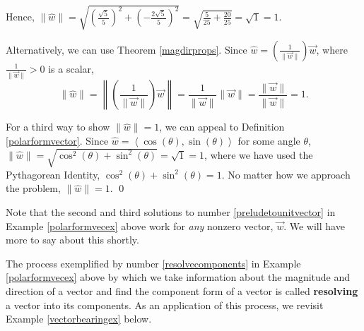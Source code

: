 \documentclass{ximera}
\begin{document}
\begin{example}
\begin{explanation}
\begin{enumerate}
\begin{enumerate}
 

Hence, $\| \hat{w} \| = \sqrt{\left( \frac{\sqrt{5}}{5}\right)^2 + \left(-\frac{2\sqrt{5}}{5}\right)^2} = \sqrt{\frac{5}{25} + \frac{20}{25}} = \sqrt{1} = 1$. 

Alternatively, we can use Theorem \ref{magdirprops}.  Since $\hat{w} = \left(\frac{1}{\| \overrightarrow{w} \|} \right) \overrightarrow{w}$, where $\frac{1}{\| \overrightarrow{w} \|}>0$ is a scalar,   \[ \| \hat{w} \| = \left\|  \left(\frac{1}{\| \overrightarrow{w} \|} \right) \overrightarrow{w} \right\| = \frac{1}{\| \overrightarrow{w} \|} \| \overrightarrow{w} \| = \frac{\| \overrightarrow{w} \|}{\| \overrightarrow{w} \|} = 1.\] 

For a third way to show $\| \hat{w} \| = 1$, we can appeal to Definition \ref{polarformvector}.  Since $\hat{w} = \left< \cos(\theta), \sin(\theta) \right>$ for some angle $\theta$, $\| \hat{w} \| = \sqrt{\cos^{2}(\theta) + \sin^{2}(\theta)} = \sqrt{1} = 1$, where we have used the Pythagorean Identity, $\cos^{2}(\theta) + \sin^{2}(\theta) = 1$.  No matter how we approach the problem, $\| \hat{w} \| = 1$. \qed


\end{enumerate}

\end{enumerate}
\end{explanation}
\end{example}

Note that the second and third solutions to number \ref{preludetounitvector} in Example \ref{polarformvecex} above work for \textit{any} nonzero vector, $\overrightarrow{w}$.  We will have more to say about this shortly.

The process exemplified by number \ref{resolvecomponents} in Example \ref{polarformvecex} above by which we take information about the magnitude and direction of a vector and find the component form of a vector is called \textbf{resolving} a vector into its components.  As an application of this process, we revisit Example \ref{vectorbearingex} below.
\end{document}
